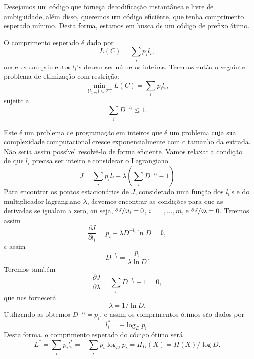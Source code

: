 Desejamos um código que forneça decodificação instantânea e livre de
ambiguidade, além disso, queremos um código eficiênte, que tenha comprimento
esperado mínimo. Desta forma, estamos em busca de um código de prefixo ótimo.

O comprimento esperado é dado por
\begin{equation}
  L(C) = \sum_{i} p_i l_i ,
\end{equation}
onde os comprimentos $l_i$'s devem ser números inteiros.
Teremos então o seguinte problema de otimização com restrição:
\begin{equation}
  \min_{\{l_{1:m}\} \in \mathbb{Z}_{+}^m} L(C) = \sum_i p_i l_i ,
\end{equation}
sujeito a
\begin{equation}
  \sum_i D^{-l_i} \leq 1 .
\end{equation}

Este é um problema de programação em inteiros que é um problema cuja
sua complexidade computacional cresce exponencialmente com o tamanho da entrada.
Não seria assim possível resolvê-lo de forma eficiente.
Vamos relaxar a condição de que $l_i$ precisa ser inteiro e considerar o Lagrangiano
\begin{equation}
  J = \sum_i p_i l_i + \lambda \left( \sum_i D^{-l_i} - 1 \right)
\end{equation}
Para encontrar os pontos estacionários de $J$, considerado uma função dos $l_i$'s
e do multiplicador lagrangiano $\lambda$, devemos encontrar as condições para que
as derivadas se igualam a zero, ou seja, $\sfrac{\partial J}{\partial l_i} = 0$,
$i=1,\ldots,m$, e $\sfrac{\partial J}{\partial \lambda} = 0$. Teremos assim
\begin{equation}
  \frac{\partial J}{\partial l_i} = p_i - \lambda D^{-l_i} \ln D = 0 ,
\end{equation}
e assim
\begin{equation}\label{eq:codotDli}
  D^{-l_i} = \frac{p_i}{\lambda \ln D} .
\end{equation}
Teremos também
\begin{equation}
  \frac{\partial J}{\partial \lambda} = \sum_i D^{-l_i} - 1 = 0 ,
\end{equation}
que nos fornecerá
\begin{equation}\label{eq:codotlambda}
  \lambda = 1 / \ln D .
\end{equation}
Utilizando as  obtemos $D^{-l_i} = p_i$,
e assim os comprimentos ótimos são dados por
\begin{equation}\label{eq:codotli}
  l^\ast_i = -\log_D p_i .
\end{equation}
Desta forma, o comprimento esperado do código ótimo será
\begin{equation}\label{eq:codotLC}
  L^\ast = \sum_i p_i l_i^\ast = - \sum_i p_i \log_D p_i = H_D (X) = H(X) / \log D .
\end{equation}

